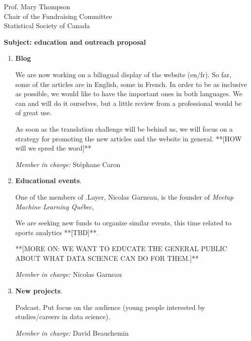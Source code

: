 \documentclass[11pt, a4paper]{letter} %
\begin{document}
\begin{letter}{
	Prof. Mary Thompson\\
	Chair of the Fundraising Committee\\
	Statistical Society of Canada
	
	\bigskip
	\textbf{Subject: education and outreach proposal}%
}
\begin{enumerate}
	\quad We are lucky to have among us a professional graphic designer, Jean-Christophe Yelle, who created, at no cost, the logo that you can see in the head of the letter. Among the other things we wish to integrate to the community are personalized e-mail addresses (@dotlayer.org) for the administering members and +++++++ **[WHAT MORE? - @steph @bute]**
	
	
	\item \textbf{Blog}
	
	\quad We are now working on a bilingual display of the website (en/fr). So far, some of the articles are in English, some in French. In order to be as inclusive as possible, we would like to have the important ones in both languages. We can and will do it ourselves, but a little review from a professional would be of great use.
	
	As soon as the translation challenge will be behind us, we will focus on a strategy for promoting the new articles and the website in general. **[HOW will we spred the word]**
	
	
	\bigskip
	\emph{Member in charge:} Stéphane Caron\\
	
	\item \textbf{Educational events}.
	
	\quad One of the members of .Layer, Nicolas Garneau, is the founder of \emph{Meetup	Machine Learning Québec}, 
	
\quad We are seeking new funds to organize similar events, this time related to sports analytics **[TBD]**.
	
**[MORE ON: WE WANT TO EDUCATE THE GENERAL PUBLIC ABOUT WHAT DATA SCIENCE CAN DO FOR THEM.]**
			
	\bigskip
	\emph{Member in charge:} Nicolas Garneau\\
	
	\item \textbf{New projects}.
	
	\quad Podcast. Put focus on the audience (young people interested by studies/careers in data science).
	
	\bigskip
	\emph{Member in charge:} David Beauchemin
\end{enumerate}


\end{letter}
\end{document}
